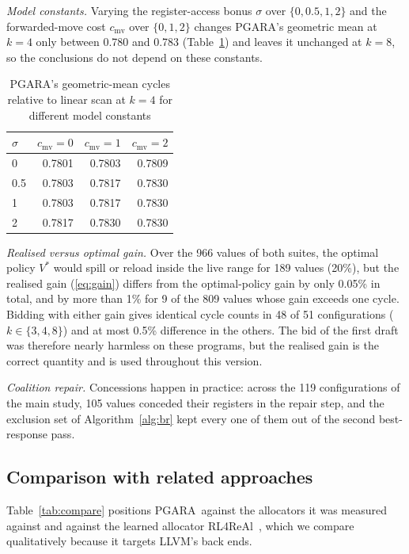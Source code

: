 \documentclass{ieeeaccess}
\newcommand{\MG}{PGARA}
\newcommand{\csv}{\sigma}
\newcommand{\cmv}{c_{\mathrm{mv}}}
\begin{document}
\textit{Model constants.} Varying the register-access bonus $\csv$ over
$\{0,0.5,1,2\}$ and the forwarded-move cost $\cmv$ over $\{0,1,2\}$
changes \MG's geometric mean at $k=4$ only between 0.780 and 0.783
(Table~\ref{tab:costs}) and leaves it unchanged at $k=8$, so the
conclusions do not depend on these constants.

\begin{table}[t]
\centering
\caption{\MG's geometric-mean cycles relative to linear scan at $k=4$
for different model constants}
\label{tab:costs}
\footnotesize
\begin{tabular}{@{}lrrr@{}}
\toprule
$\csv$ & $\cmv=0$ & $\cmv=1$ & $\cmv=2$ \\
\midrule
0 & 0.7801 & 0.7803 & 0.7809 \\
0.5 & 0.7803 & 0.7817 & 0.7830 \\
1 & 0.7803 & 0.7817 & 0.7830 \\
2 & 0.7817 & 0.7830 & 0.7830 \\
\bottomrule
\end{tabular}
\end{table}

\textit{Realised versus optimal gain.} Over the 966 values of both
suites, the optimal policy $V^\ast$ would spill or reload inside the
live range for 189 values (20\%), but the realised gain
(\ref{eq:gain}) differs from the optimal-policy gain by only 0.05\% in
total, and by more than 1\% for 9 of the 809 values whose gain exceeds
one cycle. Bidding with either gain gives identical cycle counts in 48
of 51 configurations ($k\in\{3,4,8\}$) and at most 0.5\% difference in
the others. The bid of the first draft was therefore nearly harmless on
these programs, but the realised gain is the correct quantity and is
used throughout this version.

\textit{Coalition repair.} Concessions happen in practice: across the
119 configurations of the main study, 105 values conceded their
registers in the repair step, and the exclusion set of
Algorithm~\ref{alg:br} kept every one of them out of the second
best-response pass.

\subsection{Comparison with related approaches}

Table~\ref{tab:compare} positions \MG\ against the allocators it was
measured against and against the learned allocator
RL4ReAl~\cite{venkatakeerthy2023rl4real}, which we compare
qualitatively because it targets LLVM's back ends.
\end{document}
